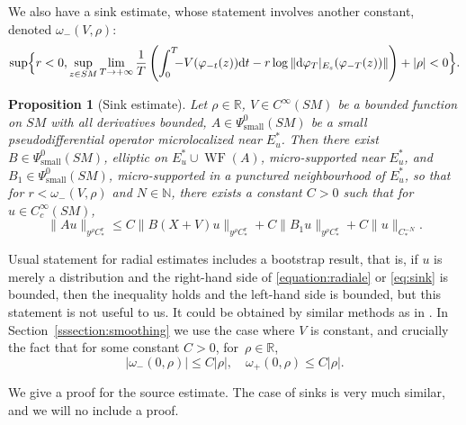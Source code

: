 \documentclass[JEP,XML,SOM,Unicode,NoFloatCountersInSection]{cedram}
\newcommand{\R}{\mathbb{R}}
\newcommand{\N}{\mathbb{N}}
\newcommand{\dd}{\mathrm{d}}
\DeclareMathOperator{\WF}{WF}
\theoremstyle{plain}
\newtheorem{proposition}{Proposition}[section]
\theoremstyle{definition}
\begin{document}
We also have a sink estimate, whose statement involves another constant, denoted $\omega_-(V,\rho)$:
\small
\begin{equation*}
\sup\Bigl\{r < 0, \sup_{z \in SM} \lim_{T \to +\infty} \frac{1}{T} \left(\int_0^T\hspace{-5pt} - V(\varphi_{-t}(z)) \dd t - r \log \|\dd \varphi_{T}|_{E_s}(\varphi_{-T}(z))\|\right) + |\rho| < 0 \Bigr\}.
\end{equation*}
\normalsize
\begin{proposition}[Sink estimate]
\label{proposition:sink}
Let $\rho\in\R$, $V\in C^\infty(SM)$ be a bounded function on $SM$ with all derivatives bounded, $A\in \Psi^0_{\mathrm{small}}(SM)$ be a small pseudodifferential operator microlocalized near $E^\ast_u$. Then there exist $B\in\Psi^0_{\mathrm{small}}(SM)$, elliptic on $E^\ast_u\cup\WF(A)$, micro-supported near $E^\ast_u$, and $B_1\in\Psi^0_{\mathrm{small}}(SM)$, micro-supported in a punctured neighbourhood of $E^\ast_u$, so that for $r< \omega_-(V,\rho)$ and $N\in\N$, there exists a constant $C>0$ such that for $u\in C^\infty_c(SM)$,
\begin{equation}\label{eq:sink}
\|Au\|_{y^\rho C^r_\ast} \leq C \| B (X+V)u\|_{y^\rho C^r_\ast} + C\|B_1 u\|_{y^\rho C^r_\ast} + C\|u\|_{C^{-N}_\ast}.
\end{equation}
\end{proposition}

Usual statement for radial estimates includes a bootstrap result, that is, if $u$ is merely a distribution and the right-hand side of \eqref{equation:radiale} or \eqref{eq:sink} is bounded, then the inequality holds and the left-hand side is bounded, but this statement is not useful to us. It could be obtained by similar methods as in \cite{Bonthonneau-Lefeuvre-21}. In Section~\ref{sssection:smoothing} we use the case where $V$ is constant, and crucially the fact that for some constant $C>0$, for~$\rho\in\R$,
\[
|\omega_-(0,\rho)| \leq C |\rho|,\quad \omega_+(0,\rho)\leq C|\rho|.
\]

We give a proof for the source estimate. The case of sinks is very much similar, and we will no include a proof.

\end{document}
